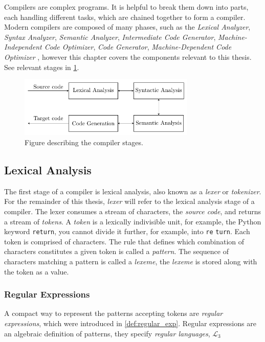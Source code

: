 Compilers are complex programs. It is helpful to break them down into parts, each handling different tasks, which are chained together to form a compiler. Modern compilers are composed of many phases, such as the \emph{Lexical Analyzer}, \emph{Syntax Analyzer}, \emph{Semantic Analyzer}, \emph{Intermediate Code Generator}, \emph{Machine-Independent Code Optimizer}, \emph{Code Generator}, \emph{Machine-Dependent Code Optimizer} \cite{dragon}, however this chapter covers the components relevant to this thesis. See relevant stages in \cref{fig:compiler-stages}.


\begin{figure}[h]
  \caption{Figure describing the compiler stages.}
  \label{fig:compiler-stages}
  \centering
  \includegraphics[width=0.75\textwidth]{figures/compiler-stages.pdf}
\end{figure}

\subsection*{Lexical Analysis}
The first stage of a compiler is lexical analysis, also known as a \emph{lexer} or \emph{tokenizer}. For the remainder of this thesis, \emph{lexer} will refer to the lexical analysis stage of a compiler. The lexer consumes a stream of characters, the \emph{source code}, and returns a stream of \emph{tokens}. A \emph{token} is a lexically indivisible unit, for example, the Python keyword \texttt{return}, you cannot divide it further, for example, into \texttt{re} \texttt{turn}. Each token is comprised of characters. The rule that defines which combination of characters constitutes a given token is called a \emph{pattern}. The sequence of characters matching a pattern is called a \emph{lexeme}, the \emph{lexeme} is stored along with the token as a value.



\subsubsection*{Regular Expressions}
A compact way to represent the patterns accepting tokens are \emph{regular expressions}, which were introduced in \cref{def:regular_exp}. Regular expressions are an algebraic definition of patterns, they specify \emph{regular languages}, $\mathcal{L}_3$

